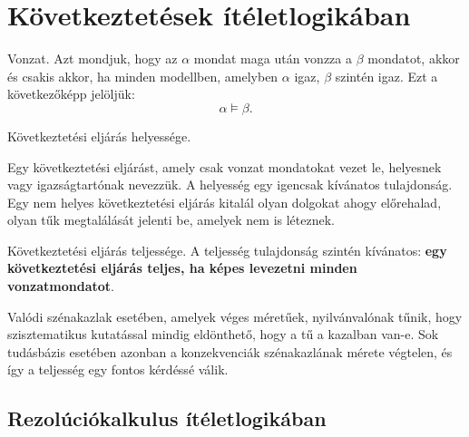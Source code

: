 \section{Következtetések ítéletlogikában}


\begin{definicio}
    Vonzat.
    Azt mondjuk, hogy az $\alpha$ mondat maga után vonzza a  $\beta$ mondatot,
    akkor és csakis akkor, ha minden modellben, amelyben $\alpha$ igaz, $\beta$ szintén
    igaz. Ezt a következőképp jelöljük: \[
        \alpha \models \beta
    .\]
\end{definicio}

\begin{definicio}
    Következtetési eljárás helyessége.

    Egy következtetési eljárást, amely csak vonzat mondatokat vezet le,
    helyesnek vagy igazságtartónak nevezzük. A helyesség egy igencsak kívánatos
    tulajdonság. Egy nem helyes következtetési eljárás kitalál olyan dolgokat
    ahogy előrehalad, olyan tűk megtalálását jelenti be, amelyek nem is
    léteznek.
\end{definicio}

\begin{definicio}
    Következtetési eljárás teljessége.  A teljesség tulajdonság szintén
    kívánatos: {\bf egy következtetési eljárás teljes, ha képes levezetni
    minden vonzatmondatot}.

    Valódi szénakazlak esetében, amelyek véges méretűek, nyilvánvalónak tűnik,
    hogy szisztematikus kutatással mindig eldönthető, hogy a tű a kazalban
    van-e. Sok tudásbázis esetében azonban a konzekvenciák szénakazlának mérete
    végtelen, és így a teljesség egy fontos kérdéssé válik.
\end{definicio}

\subsection{Rezolúciókalkulus ítéletlogikában}
